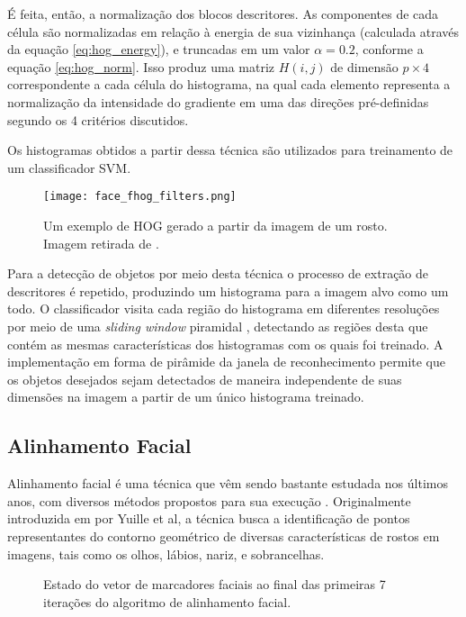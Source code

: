 É feita, então, a normalização dos blocos descritores.
As componentes de cada célula são normalizadas em relação à energia de sua vizinhança (calculada através da equação \ref{eq:hog_energy}), e truncadas em um valor $\alpha=0.2$, conforme a equação \ref{eq:hog_norm}.
Isso produz uma matriz $H(i,j)$ de dimensão $p\times4$ correspondente a cada célula do histograma, na qual cada elemento representa a normalização da intensidade do gradiente em uma das direções pré-definidas segundo os 4 critérios discutidos.

Os histogramas obtidos a partir dessa técnica são utilizados para treinamento de um classificador SVM.

\begin{figure}[ht]
    \centering
    \texttt{[image: face\_fhog\_filters.png]}
    \caption{Um exemplo de HOG gerado a partir da imagem de um rosto. Imagem retirada de \cite{kingDlib18Released}.}
    \label{fig:dlib_hog}
\end{figure}

Para a detecção de objetos por meio desta técnica o processo de extração de descritores é repetido, produzindo um histograma para a imagem alvo como um todo.
O classificador visita cada região do histograma em diferentes resoluções por meio de uma \textit{sliding window} piramidal \cite{dalalHistogramsOrientedGradients2005}, detectando as regiões desta que contém as mesmas características dos histogramas com os quais foi treinado.
A implementação em forma de pirâmide da janela de reconhecimento permite que os objetos desejados sejam detectados de maneira independente de suas dimensões na imagem a partir de um único histograma treinado.

\subsection{Alinhamento Facial}
\label{sec:faciallm}

Alinhamento facial é uma técnica que vêm sendo bastante estudada nos últimos anos, com diversos métodos propostos para sua execução \cite{caoFaceAlignmentExplicit2014, liangFaceAlignmentComponentBased2008, dantoneRealtimeFacialFeature2012, xiangxinzhuFaceDetectionPose2012}.
Originalmente introduzida em \cite{yuilleFeatureExtractionFaces1992} por Yuille et al, a técnica busca a identificação de pontos representantes do contorno geométrico de diversas características de rostos em imagens, tais como os olhos, lábios, nariz, e sobrancelhas.

\begin{figure}[ht]
    \centering
    \resizebox{0.9\textwidth}{!}{
        
        }
    \caption{Estado do vetor de marcadores faciais ao final das primeiras 7 iterações do algoritmo de alinhamento facial.}
    \label{fig:faciallm_iters}
\end{figure}

